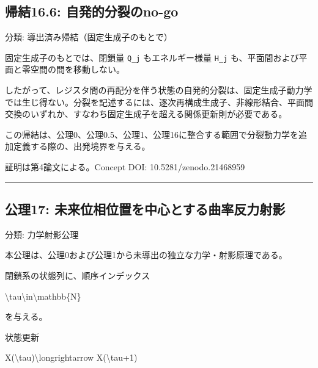 \documentclass[
  a4paper,
]{ltjsarticle}
\newenvironment{Shaded}{}{}
\newcommand{\NormalTok}[1]{#1}
\begin{document}
\subsection{帰結16.6:
自発的分裂のno-go}\label{ux5e30ux7d5016.6-ux81eaux767aux7684ux5206ux88c2ux306eno-go}

分類: 導出済み帰結（固定生成子のもとで）

固定生成子のもとでは、閉鎖量 \texttt{Q\_j} もエネルギー様量
\texttt{H\_j} も、平面間および平面と零空間の間を移動しない。

したがって、レジスタ間の再配分を伴う状態の自発的分裂は、固定生成子動力学では生じ得ない。分裂を記述するには、逐次再構成生成子、非線形結合、平面間交換のいずれか、すなわち固定生成子を超える関係更新則が必要である。

この帰結は、公理0、公理0.5、公理1、公理16に整合する範囲で分裂動力学を追加定義する際の、出発境界を与える。

証明は第4論文による。Concept DOI: 10.5281/zenodo.21468959

\begin{center}\rule{0.5\linewidth}{0.5pt}\end{center}

\subsection{公理17:
未来位相位置を中心とする曲率反力射影}\label{ux516cux740617-ux672aux6765ux4f4dux76f8ux4f4dux7f6eux3092ux4e2dux5fc3ux3068ux3059ux308bux66f2ux7387ux53cdux529bux5c04ux5f71}

分類: 力学射影公理

本公理は、公理0および公理1から未導出の独立な力学・射影原理である。

閉鎖系の状態列に、順序インデックス

\begin{Shaded}
\begin{Highlighting}[]
\NormalTok{\textbackslash{}tau\textbackslash{}in\textbackslash{}mathbb\{N\}}
\end{Highlighting}
\end{Shaded}

を与える。

状態更新

\begin{Shaded}
\begin{Highlighting}[]
\NormalTok{X(\textbackslash{}tau)\textbackslash{}longrightarrow X(\textbackslash{}tau+1)}
\end{Highlighting}
\end{Shaded}
\end{document}
